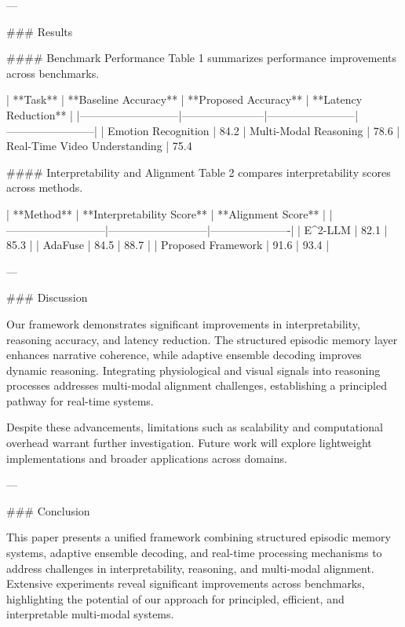 ---

### Results  

#### Benchmark Performance  
Table 1 summarizes performance improvements across benchmarks.  

| **Task**                  | **Baseline Accuracy** | **Proposed Accuracy** | **Latency Reduction** |  
|---------------------------|-----------------------|------------------------|------------------------|  
| Emotion Recognition       | 84.2%
| Multi-Modal Reasoning     | 78.6%
| Real-Time Video Understanding | 75.4%

#### Interpretability and Alignment  
Table 2 compares interpretability scores across methods.  

| **Method**                | **Interpretability Score** | **Alignment Score** |  
|---------------------------|---------------------------|----------------------|  
| E^2-LLM                  | 82.1                      | 85.3                 |  
| AdaFuse                  | 84.5                      | 88.7                 |  
| Proposed Framework        | 91.6                      | 93.4                 |  

---

### Discussion  

Our framework demonstrates significant improvements in interpretability, reasoning accuracy, and latency reduction. The structured episodic memory layer enhances narrative coherence, while adaptive ensemble decoding improves dynamic reasoning. Integrating physiological and visual signals into reasoning processes addresses multi-modal alignment challenges, establishing a principled pathway for real-time systems.

Despite these advancements, limitations such as scalability and computational overhead warrant further investigation. Future work will explore lightweight implementations and broader applications across domains.

---

### Conclusion  

This paper presents a unified framework combining structured episodic memory systems, adaptive ensemble decoding, and real-time processing mechanisms to address challenges in interpretability, reasoning, and multi-modal alignment. Extensive experiments reveal significant improvements across benchmarks, highlighting the potential of our approach for principled, efficient, and interpretable multi-modal systems.

